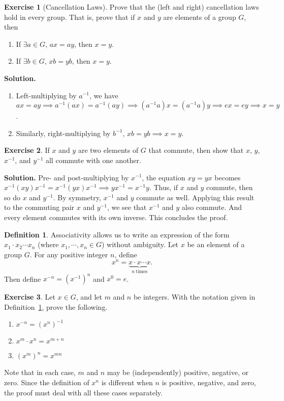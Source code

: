 \documentclass[svgnames]{article}
\theoremstyle{definition}
\newtheorem{Definition}[Theorem]{Definition}
\newtheorem{Exercise}{Exercise}[section]
\theoremstyle{remark}
\begin{document}
\begin{Exercise}[Cancellation Laws]
Prove that the (left and right) cancellation laws hold in every group. That is, prove that if $x$ and $y$ are elements of a group $G$, then
\begin{enumerate}
\item If $\exists a \in G$, $ax = ay$, then $x = y$.
\item If $\exists b \in G$, $xb = yb$, then $x = y$.
\end{enumerate}
\textbf{Solution.} \begin{enumerate}
\item Left-multiplying by $a^{-1}$, we have $ax = ay \implies a^{-1}(ax) = a^{-1}(ay) \implies (a^{-1}a)x = (a^{-1}a)y \implies ex = ey \implies x = y$.
\item Similarly, right-multiplying by $b^{-1}$, $xb = yb \implies x = y$.
\end{enumerate}
\end{Exercise}

\begin{Exercise}
If $x$ and $y$ are two elements of $G$ that commute, then show that $x$, $y$, $x^{-1}$, and $y^{-1}$ all commute with one another.

\textbf{Solution.} Pre- and post-multiplying by $x^{-1}$, the equation $xy = yx$ becomes $x^{-1}(xy)x^{-1} = x^{-1}(yx)x^{-1} \implies yx^{-1} = x^{-1}y$. Thus, if $x$ and $y$ commute, then so do $x$ and $y^{-1}$. By symmetry, $x^{-1}$ and $y$ commute as well. Applying this result to the commuting pair $x$ and $y^{-1}$, we see that $x^{-1}$ and $y$ also commute. And every element commutes with its own inverse. This concludes the proof.
\end{Exercise}

\begin{Definition}\label{def:Power}
Associativity allows us to write an expression of the form $x_1 \cdot x_2 \cdots x_n$ (where $x_1, \cdots, x_n \in G$) without ambiguity. Let $x$ be an element of a group $G$. For any positive integer $n$, define
\begin{equation*}
x^n = \underbrace{x \cdot x \cdots x}_{n\ \text{times}}.
\end{equation*}
Then define $x^{-n} = (x^{-1})^n$ and $x^0 = e$.
\end{Definition}
\begin{Exercise}
Let $x \in G$, and let $m$ and $n$ be integers. With the notation given in Definition~\ref{def:Power}, prove the following.
\begin{enumerate}
\item $x^{-n} = (x^n)^{-1}$
\item $x^m \cdot x^n = x^{m + n}$
\item $(x^m)^n = x^{mn}$
\end{enumerate}
Note that in each case, $m$ and $n$ may be (independently) positive, negative, or zero. Since the definition of $x^n$ is different when $n$ is positive, negative, and zero, the proof must deal with all these cases separately.
\end{Exercise}
\end{document}
